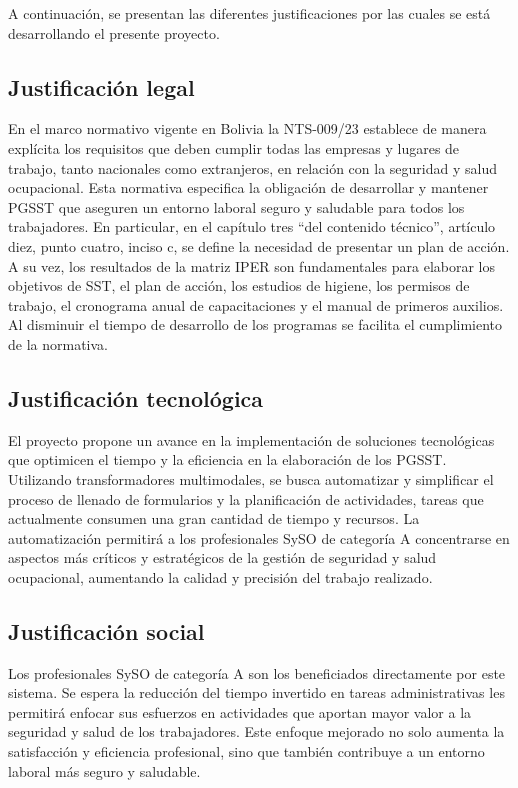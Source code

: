 A continuación, se presentan las diferentes justificaciones por las cuales se está desarrollando el presente proyecto.

\subsection{Justificación legal}
En el marco normativo vigente en Bolivia la NTS-009/23 establece de manera explícita los requisitos que deben cumplir todas las empresas y lugares de trabajo, tanto nacionales como extranjeros, en relación con la seguridad y salud ocupacional. Esta normativa especifica la obligación de desarrollar y mantener PGSST que aseguren un entorno laboral seguro y saludable para todos los trabajadores. En particular, en el capítulo tres ``del contenido técnico'', artículo diez, punto cuatro, inciso c, se define la necesidad de presentar un plan de acción. A su vez, los resultados de la matriz IPER son fundamentales para elaborar los objetivos de SST, el plan de acción, los estudios de higiene, los permisos de trabajo, el cronograma anual de capacitaciones y el manual de primeros auxilios. Al disminuir el tiempo de desarrollo de los programas se facilita el cumplimiento de la normativa.

\subsection{Justificación tecnológica}

El proyecto propone un avance en la implementación de soluciones tecnológicas que optimicen el tiempo y la eficiencia en la elaboración de los PGSST. Utilizando transformadores multimodales, se busca automatizar y simplificar el proceso de llenado de formularios y la planificación de actividades, tareas que actualmente consumen una gran cantidad de tiempo y recursos. La automatización permitirá a los profesionales SySO de categoría A concentrarse en aspectos más críticos y estratégicos de la gestión de seguridad y salud ocupacional, aumentando la calidad y precisión del trabajo realizado. 

\subsection{Justificación social}

Los profesionales SySO de categoría A son los beneficiados directamente por este sistema. Se espera la reducción del tiempo invertido en tareas administrativas les permitirá enfocar sus esfuerzos en actividades que aportan mayor valor a la seguridad y salud de los trabajadores. Este enfoque mejorado no solo aumenta la satisfacción y eficiencia profesional, sino que también contribuye a un entorno laboral más seguro y saludable. 

